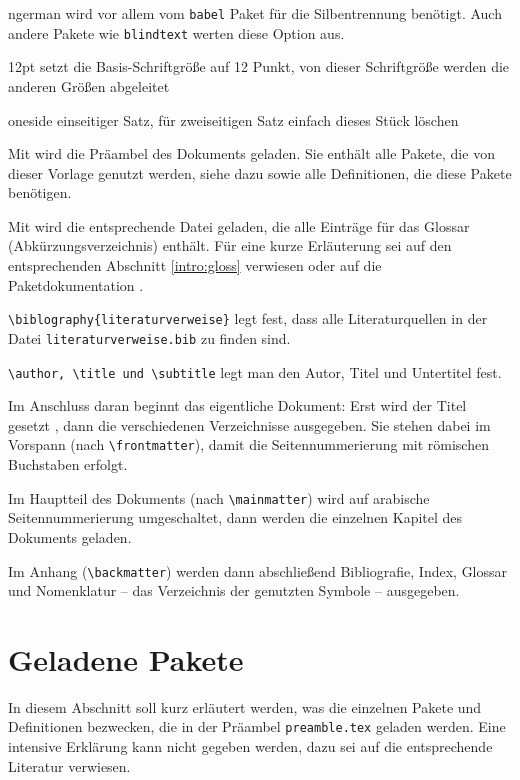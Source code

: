 \begin{compactdesc}
\item [ngerman] wird vor allem vom \texttt{babel} Paket für die Silbentrennung benötigt. Auch andere Pakete wie \texttt{blindtext} werten diese Option aus.
\item [12pt] setzt die Basis-Schriftgröße auf 12 Punkt, von dieser Schriftgröße werden die anderen Größen abgeleitet
\item [oneside] einseitiger Satz, für zweiseitigen Satz einfach dieses Stück löschen
\end{compactdesc}

Mit \verb|| wird die Präambel des Dokuments geladen. Sie enthält alle Pakete, die von dieser Vorlage genutzt werden, siehe dazu  sowie alle Definitionen, die diese Pakete benötigen.

Mit  \verb|| wird die entsprechende Datei geladen, die alle Einträge für das Glossar (Abkürzungsverzeichnis) enthält. Für eine kurze Erläuterung sei auf den entsprechenden Abschnitt \ref{intro:gloss} verwiesen oder auf die Paketdokumentation .

\verb|\biblography{literaturverweise}| legt fest, dass alle Literaturquellen in der Datei \texttt{literaturverweise.bib} zu finden sind.

\verb|\author, \title und \subtitle| legt man den Autor, Titel und Untertitel fest.

Im Anschluss daran beginnt das eigentliche Dokument: Erst wird der Titel gesetzt , dann die verschiedenen Verzeichnisse ausgegeben. Sie stehen dabei im Vorspann (nach \verb|\frontmatter|), damit die Seitennummerierung mit römischen Buchstaben erfolgt.

Im Hauptteil des Dokuments (nach \verb|\mainmatter|) wird auf arabische Seitennummerierung umgeschaltet, dann werden die einzelnen Kapitel des Dokuments geladen.

Im Anhang (\verb|\backmatter|) werden dann abschließend Bibliografie, Index, Glossar und Nomenklatur -- das Verzeichnis der genutzten Symbole -- ausgegeben. 

\section{Geladene Pakete}\label{sec:loadedpackages}

In diesem Abschnitt soll kurz erl\"autert werden, was die einzelnen Pakete und Definitionen bezwecken, die in der Pr\"aambel \texttt{preamble.tex} geladen werden. Eine intensive Erkl\"arung kann nicht gegeben werden, dazu sei auf die entsprechende Literatur verwiesen.

